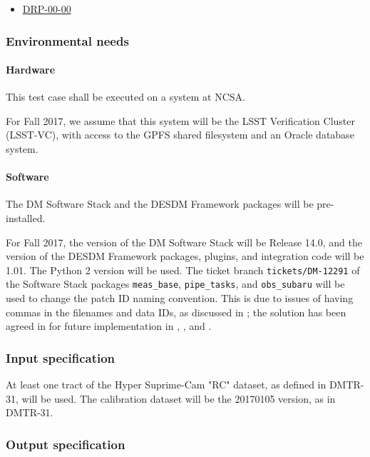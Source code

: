 \begin{itemize}

  \item{\hyperref[drp-00-00]{DRP-00-00}}

\end{itemize}

\subsubsection{Environmental needs}

\paragraph{Hardware}\label{sec:hardware}

This test case shall be executed on a system at NCSA.

For Fall 2017, we assume that this system will be the LSST Verification Cluster (LSST-VC),
with access to the GPFS shared filesystem and an Oracle database system.

\paragraph{Software}\label{sec:software}
The DM Software Stack and the DESDM Framework packages will be pre-installed.

For Fall 2017, the version of the DM Software Stack will be Release 14.0, and the version of the DESDM Framework packages, plugins, and integration code will be 1.01.
The Python 2 version will be used.
The ticket branch \texttt{tickets/DM-12291} of the Software Stack packages \texttt{meas{\_}base}, \texttt{pipe{\_}tasks}, and \texttt{obs{\_}subaru} will be used to change the patch ID naming convention.
This is due to issues of having commas in the filenames and data IDs, as discussed in ; the solution has been agreed in  for future implementation in , , and .

\subsubsection{Input specification}\label{sec:input}

At least one tract of the Hyper Suprime-Cam "RC" dataset, as defined in DMTR-31, will be used.
The calibration dataset will be the 20170105 version, as in DMTR-31.


\subsubsection{Output specification}

